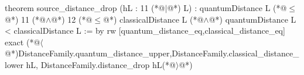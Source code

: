 theorem source_distance_drop (hL : 11 (*@$\mid$@*) L) :
    quantumDistance L (*@$\le$@*) 11 (*@$\land$@*) 12 (*@$\le$@*) classicalDistance L (*@$\land$@*) quantumDistance L < classicalDistance L := by
  rw [quantum_distance_eq,classical_distance_eq]
  exact (*@$\langle$@*)DistanceFamily.quantum_distance_upper,DistanceFamily.classical_distance_lower hL,
    DistanceFamily.distance_drop hL(*@$\rangle$@*)
